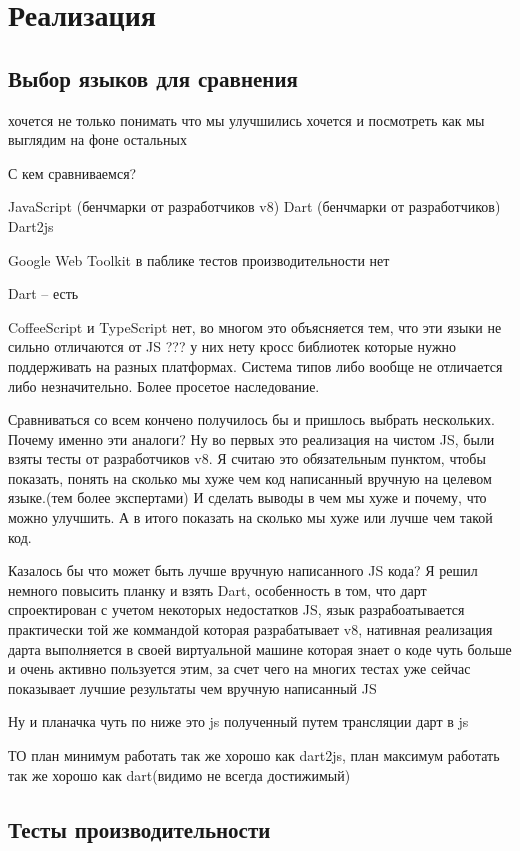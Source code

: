 \chapter{Реализация}

\section{Выбор языков для сравнения}
хочется не только понимать что мы улучшились хочется и посмотреть как мы выглядим на фоне остальных

С кем сравниваемся?

JavaScript (бенчмарки от разработчиков v8)
Dart (бенчмарки от разработчиков)
Dart2js

Google Web Toolkit
в паблике тестов производительности нет

Dart -- есть

CoffeeScript и TypeScript нет, во многом это объясняется тем, что эти языки не сильно отличаются от JS ??? у них нету кросс библиотек которые нужно поддерживать на разных платформах. Система типов либо вообще не отличается либо незначительно. Более просетое наследование.

Сравниваться со всем кончено получилось бы и пришлось выбрать нескольких.
Почему именно эти аналоги?
Ну во первых это реализация на чистом JS, были взяты тесты от разработчиков v8. Я считаю это обязательным пунктом, чтобы показать, понять на сколько мы хуже чем код написанный вручную на целевом языке.(тем более экспертами) И сделать выводы в чем мы хуже и почему, что можно улучшить. А в итого показать на сколько мы хуже или лучше чем такой код.

Казалось бы что может быть лучше вручную написанного JS кода? Я решил немного повысить планку и взять Dart, особенность в том, что дарт спроектирован с учетом некоторых недостатков JS, язык разрабоатывается практически той же коммандой которая разрабатывает v8, нативная реализация дарта выполняется в своей виртуальной машине которая знает о коде чуть больше и очень активно пользуется этим, за счет чего на многих тестах уже сейчас показывает лучшие результаты чем вручную написанный JS

Ну и планачка чуть по ниже это js полученный путем трансляции дарт в js

ТО план минимум работать так же хорошо как dart2js, план максимум работать так же хорошо как dart(видимо не всегда достижимый)



\section{Тесты производительности}

